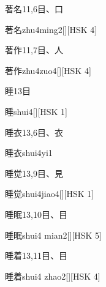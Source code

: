 \begin{entry}{著名}{11,6}{⽬、⼝}
  \begin{phonetics}{著名}{zhu4ming2}[][HSK 4]
  \end{phonetics}
\end{entry}

\begin{entry}{著作}{11,7}{⽬、⼈}
  \begin{phonetics}{著作}{zhu4zuo4}[][HSK 4]
  \end{phonetics}
\end{entry}

\begin{entry}{睡}{13}{⽬}
  \begin{phonetics}{睡}{shui4}[][HSK 1]
  \end{phonetics}
\end{entry}

\begin{entry}{睡衣}{13,6}{⽬、⾐}
  \begin{phonetics}{睡衣}{shui4yi1}
  \end{phonetics}
\end{entry}

\begin{entry}{睡觉}{13,9}{⽬、⾒}
  \begin{phonetics}{睡觉}{shui4jiao4}[][HSK 1]
  \end{phonetics}
\end{entry}

\begin{entry}{睡眠}{13,10}{⽬、⽬}
  \begin{phonetics}{睡眠}{shui4 mian2}[][HSK 5]
  \end{phonetics}
\end{entry}

\begin{entry}{睡着}{13,11}{⽬、⽬}
  \begin{phonetics}{睡着}{shui4 zhao2}[][HSK 4]
  \end{phonetics}
\end{entry}

